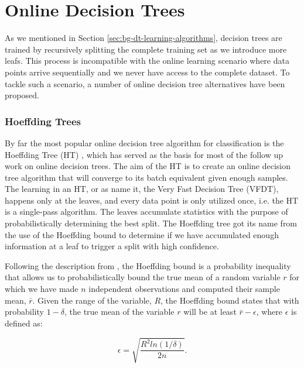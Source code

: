 \section{Online Decision Trees}
\label{sec:bg-dt-online-trees}

As we mentioned in Section \ref{sec:bg-dt-learning-algorithms}, decision trees are trained by recursively splitting the complete
training set as we introduce more leafs. This process is incompatible with the online
learning scenario where data points arrive sequentially and we never have access to
the complete dataset. To tackle such a scenario, a number of online decision tree
alternatives have been proposed.

\subsubsection*{Hoeffding Trees}

By far the most popular online decision tree algorithm for classification is the Hoeffding Tree (HT) \cite{vfdt},
which has served as the basis for most of the follow up work on online decision
trees. The aim of the HT is to create an online decision tree algorithm that will converge
to its batch equivalent given enough samples.
The learning in an HT, or as \citet{vfdt} name it, the Very Fast Decision
Tree (VFDT), happens only at the leaves, and every data point is only utilized
once, i.e. the HT is a single-pass algorithm. The leaves accumulate statistics
with the purpose of probabilistically determining the best split. The
Hoeffding tree got its name from the use of the Hoeffding bound to determine if we have accumulated
enough information at a leaf to trigger a split with high confidence.

Following the description from \citet{vfdt}, the Hoeffding bound \cite{hoeffding-bound} is a probability inequality that allows
us to probabilistically bound the true mean of a random variable $r$ for which we have
made $n$ independent observations and computed their sample mean, $\bar{r}$. Given
the range of the variable, $R$, the Hoeffding bound states that with probability
$1-\delta$, the true mean of the variable $r$ will be at least $\bar{r}-\epsilon$, where
$\epsilon$ is defined as:

\begin{equation}
\epsilon = \sqrt{\frac{R^2ln(1/\delta)}{2n}}.
\end{equation}

